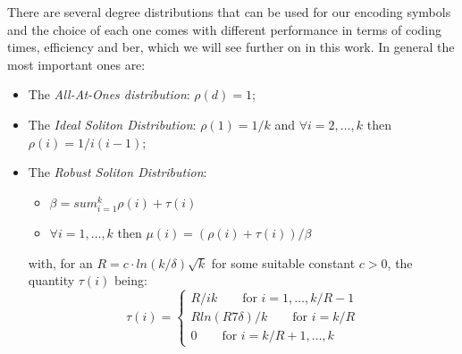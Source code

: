 There are several degree distributions that can be used for our encoding symbols and the choice of each one comes with different performance in terms of coding times, efficiency and \gls{ber}, which we will see further on in this work. In general the most important ones are:
\begin{itemize}
  \item The \textit{All-At-Ones distribution}: $\rho(d) = 1$;
  \item The \textit{Ideal Soliton Distribution}: $\rho(1) = 1/k$ and $\forall i = 2,\dots,k$ then $\rho(i) = 1/i(i-1)$;
  \item The \textit{Robust Soliton Distribution}:
  \begin{itemize}
    \item $\beta  = sum_{i=1}^{k}\rho(i)+\tau(i)$
    \item $\forall i = 1,\dots,k$ then $\mu(i) = (\rho(i)+\tau(i))/\beta$
  \end{itemize}
  with, for an $R = c\cdot ln(k/\delta)\sqrt k$ for some suitable constant $c > 0$, the quantity $\tau(i)$ being:\\
  \[
  \tau(i) =
  \begin{cases}
    R/ik \qquad \text{for } i = 1,\dots,k/R-1\\
    Rln(R7\delta)/k \qquad \text{for } i = k/R\\
    0 \qquad \text{for } i = k/R +1, \dots,k
  \end{cases}
  \]
\end{itemize}

